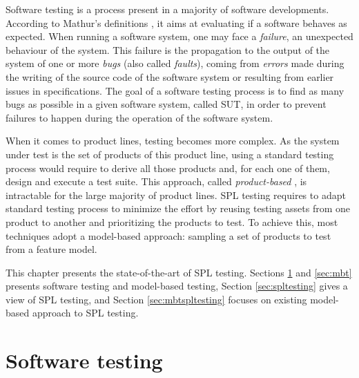 Software testing is a process present in a majority of software developments. According to Mathur's definitions \cite{Mathur2008}, it aims at evaluating if a software behaves as expected. When running a software system, one may face a \emph{\gls{failure}}, \ie an unexpected behaviour of the system. This failure is the propagation to the output of the system of one or more \emph{\glspl{bug}} (also called \emph{\glspl{fault}}), coming from \emph{\glspl{error}} made during the writing of the source code of the software system or resulting from earlier issues in specifications. The goal of a software testing process is to find as many bugs as possible in a given software system, called \acrfull{SUT}, in order to prevent failures to happen during the operation of the software system.

When it comes to product lines, testing becomes more complex. As the system under test is the set of products of this product line, using a standard testing process would require to derive all those products and, for each one of them, design and execute a test suite. This approach, called \emph{product-based} \cite{Thum2014}, is intractable for the large majority of product lines. \gls{SPL} testing requires to adapt standard testing process to minimize the effort by reusing testing assets from one product to another and prioritizing the products to test. To achieve this, most techniques adopt a model-based approach: \eg sampling a set of products to test from a feature model.

This chapter presents the state-of-the-art of SPL testing. Sections \ref{sec:softwaretesting} and \ref{sec:mbt} presents software testing and model-based testing, Section \ref{sec:spltesting} gives a view of \gls{SPL} testing, and Section \ref{sec:mbtspltesting} focuses on existing model-based approach to \gls{SPL} testing.


\section{Software testing}

\label{sec:softwaretesting}

